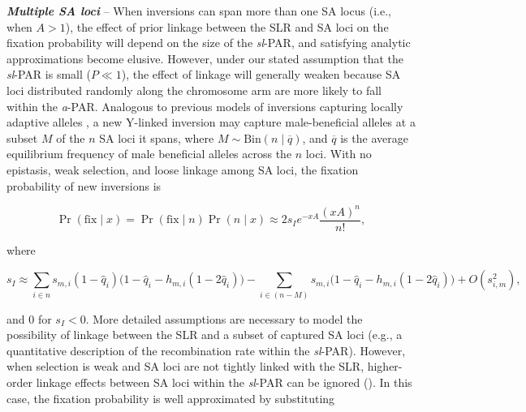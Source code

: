 \documentclass[11pt]{article}
\begin{document}
 \vspace{12pt}

{\bf \itshape Multiple SA loci} -- When inversions can span more than one SA locus (i.e., when $A > 1$), the effect of prior linkage between the SLR and SA loci on the fixation probability will depend on the size of the {\itshape sl}-PAR, and satisfying analytic approximations become elusive. However, under our stated assumption that the {\itshape sl}-PAR is small ($P \ll 1$), the effect of linkage will generally weaken because SA loci distributed randomly along the chromosome arm are more likely to fall within the {\itshape a}-PAR. Analogous to previous models of inversions capturing locally adaptive alleles \citep{KirkpatrickBarton2003, Connallon2018}, a new Y-linked inversion may capture male-beneficial alleles at a subset $M$ of the $n$ SA loci it spans, where $M \sim \text{Bin}(n \mid \overline{q})$, and $\overline{q}$ is the average equilibrium frequency of male beneficial alleles across the $n$ loci. With no epistasis, weak selection, and loose linkage among SA loci, the fixation probability of new inversions is

\begin{equation}\label{eq:SApFixMultiLoc}
	\Pr(\text{fix} \mid x) = \Pr(\text{fix} \mid n) \Pr(n \mid x) \approx 2 s_I e^{-x A} \frac{(xA)^n}{n!},
\end{equation}

\noindent where

\begin{equation}\label{eq:SASIMultiLoc}
	s_I \approx \sum_{i \in n} s_{m,i} (1 - \hat{q}_{i}) \big( 1 - \hat{q}_i - h_{m,i} (1 - 2 \hat{q}_i) \big) - \sum_{i \in (n-M)} s_{m,i} \big( 1 - \hat{q}_i - h_{m,i} (1 - 2 \hat{q}_i) \big) + O(s_{i,m}^2),
\end{equation}

\noindent and $0$ for $s_I < 0$. More detailed assumptions are necessary to model the possibility of linkage between the SLR and a subset of captured SA loci (e.g., a quantitative description of the recombination rate within the {\itshape sl}-PAR). However, when selection is weak and SA loci are not tightly linked with the SLR, higher-order linkage effects between SA loci within the {\itshape sl}-PAR can be ignored (\citealt{Otto2019}). In this case, the fixation probability is well approximated by substituting 
\end{document}
